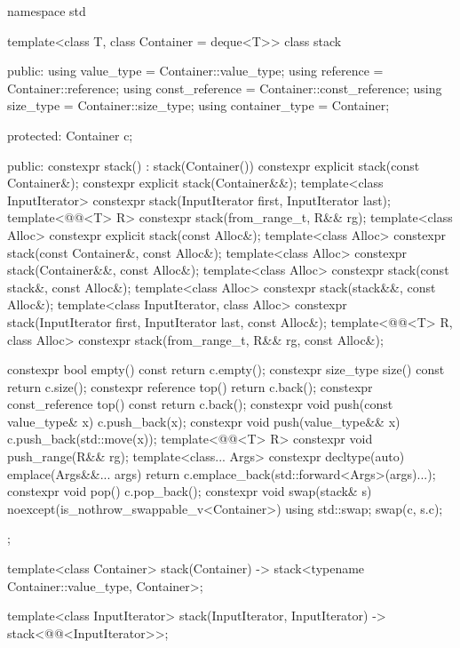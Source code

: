 \begin{codeblock}
namespace std {
  template<class T, class Container = deque<T>>
  class stack {
  public:
    using value_type      = Container::value_type;
    using reference       = Container::reference;
    using const_reference = Container::const_reference;
    using size_type       = Container::size_type;
    using container_type  = Container;

  protected:
    Container c;

  public:
    constexpr stack() : stack(Container()) {}
    constexpr explicit stack(const Container&);
    constexpr explicit stack(Container&&);
    template<class InputIterator> constexpr stack(InputIterator first, InputIterator last);
    template<@@<T> R>
      constexpr stack(from_range_t, R&& rg);
    template<class Alloc> constexpr explicit stack(const Alloc&);
    template<class Alloc> constexpr stack(const Container&, const Alloc&);
    template<class Alloc> constexpr stack(Container&&, const Alloc&);
    template<class Alloc> constexpr stack(const stack&, const Alloc&);
    template<class Alloc> constexpr stack(stack&&, const Alloc&);
    template<class InputIterator, class Alloc>
      constexpr stack(InputIterator first, InputIterator last, const Alloc&);
    template<@@<T> R, class Alloc>
      constexpr stack(from_range_t, R&& rg, const Alloc&);

    constexpr bool              empty() const     { return c.empty(); }
    constexpr size_type         size()  const     { return c.size(); }
    constexpr reference         top()             { return c.back(); }
    constexpr const_reference   top()   const     { return c.back(); }
    constexpr void push(const value_type& x)      { c.push_back(x); }
    constexpr void push(value_type&& x)           { c.push_back(std::move(x)); }
    template<@@<T> R>
      constexpr void push_range(R&& rg);
    template<class... Args>
      constexpr decltype(auto) emplace(Args&&... args)
        { return c.emplace_back(std::forward<Args>(args)...); }
    constexpr void pop()                          { c.pop_back(); }
    constexpr void swap(stack& s) noexcept(is_nothrow_swappable_v<Container>)
      { using std::swap; swap(c, s.c); }
  };

  template<class Container>
    stack(Container) -> stack<typename Container::value_type, Container>;

  template<class InputIterator>
    stack(InputIterator, InputIterator) -> stack<@@<InputIterator>>;

}
\end{codeblock}
